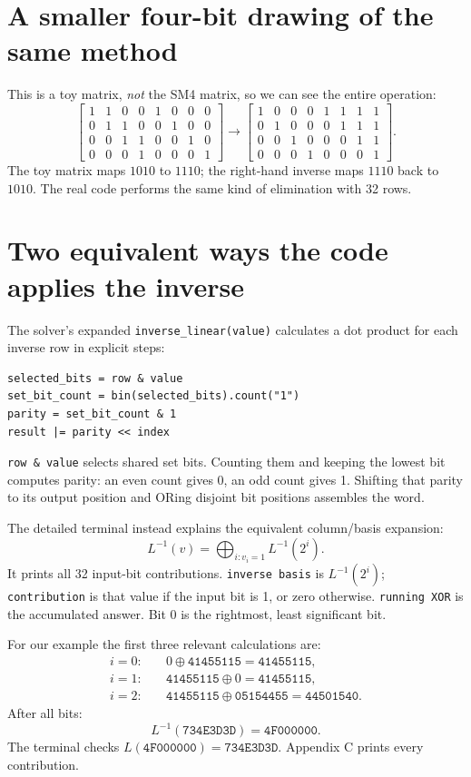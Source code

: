 \documentclass[11pt,a4paper]{report}
\newcommand{\hx}[1]{\texttt{#1}}
\newcommand{\xor}{\mathbin{\oplus}}
\begin{document}
\section{A smaller four-bit drawing of the same method}
This is a toy matrix, \emph{not} the SM4 matrix, so we can see the entire operation:
\[
\left[\begin{array}{cccc|cccc}
1&1&0&0&1&0&0&0\\0&1&1&0&0&1&0&0\\0&0&1&1&0&0&1&0\\0&0&0&1&0&0&0&1
\end{array}\right]
\longrightarrow
\left[\begin{array}{cccc|cccc}
1&0&0&0&1&1&1&1\\0&1&0&0&0&1&1&1\\0&0&1&0&0&0&1&1\\0&0&0&1&0&0&0&1
\end{array}\right].
\]
The toy matrix maps \(1010\) to \(1110\); the right-hand inverse maps \(1110\) back to \(1010\). The real code performs the same kind of elimination with 32 rows.

\section{Two equivalent ways the code applies the inverse}
The solver's expanded \texttt{inverse\_linear(value)} calculates a dot product for each inverse row in explicit steps:
\begin{Verbatim}
selected_bits = row & value
set_bit_count = bin(selected_bits).count("1")
parity = set_bit_count & 1
result |= parity << index
\end{Verbatim}
\texttt{row \& value} selects shared set bits. Counting them and keeping the lowest bit computes parity: an even count gives 0, an odd count gives 1. Shifting that parity to its output position and ORing disjoint bit positions assembles the word.

The detailed terminal instead explains the equivalent column/basis expansion:
\[L^{-1}(v)=\mathop{\bigoplus}_{i:v_i=1}L^{-1}(2^i).\]
It prints all 32 input-bit contributions. \texttt{inverse basis} is \(L^{-1}(2^i)\); \texttt{contribution} is that value if the input bit is 1, or zero otherwise. \texttt{running XOR} is the accumulated answer. Bit 0 is the rightmost, least significant bit.

For our example the first three relevant calculations are:
\begin{align*}
i=0:&\quad 0\xor\hx{41455115}=\hx{41455115},\\
i=1:&\quad\hx{41455115}\xor0=\hx{41455115},\\
i=2:&\quad\hx{41455115}\xor\hx{05154455}=\hx{44501540}.
\end{align*}
After all bits:
\[\boxed{L^{-1}(\hx{734E3D3D})=\hx{4F000000}}.\]
The terminal checks \(L(\hx{4F000000})=\hx{734E3D3D}\). Appendix C prints every contribution.
\end{document}

